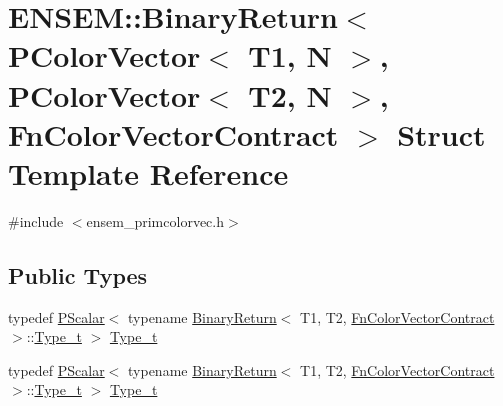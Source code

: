 \hypertarget{structENSEM_1_1BinaryReturn_3_01PColorVector_3_01T1_00_01N_01_4_00_01PColorVector_3_01T2_00_01N_62be6e61418b73621b95945775a1489e}{}\section{E\+N\+S\+EM\+:\+:Binary\+Return$<$ P\+Color\+Vector$<$ T1, N $>$, P\+Color\+Vector$<$ T2, N $>$, Fn\+Color\+Vector\+Contract $>$ Struct Template Reference}
\label{structENSEM_1_1BinaryReturn_3_01PColorVector_3_01T1_00_01N_01_4_00_01PColorVector_3_01T2_00_01N_62be6e61418b73621b95945775a1489e}


{\ttfamily \#include $<$ensem\+\_\+primcolorvec.\+h$>$}

\subsection*{Public Types}
\begin{DoxyCompactItemize}
\item 
typedef \mbox{\hyperlink{classENSEM_1_1PScalar}{P\+Scalar}}$<$ typename \mbox{\hyperlink{structENSEM_1_1BinaryReturn}{Binary\+Return}}$<$ T1, T2, \mbox{\hyperlink{structENSEM_1_1FnColorVectorContract}{Fn\+Color\+Vector\+Contract}} $>$\+::\mbox{\hyperlink{structENSEM_1_1BinaryReturn_3_01PColorVector_3_01T1_00_01N_01_4_00_01PColorVector_3_01T2_00_01N_62be6e61418b73621b95945775a1489e_ab0000a71b9f307783d8928d9bc4488aa}{Type\+\_\+t}} $>$ \mbox{\hyperlink{structENSEM_1_1BinaryReturn_3_01PColorVector_3_01T1_00_01N_01_4_00_01PColorVector_3_01T2_00_01N_62be6e61418b73621b95945775a1489e_ab0000a71b9f307783d8928d9bc4488aa}{Type\+\_\+t}}
\item 
typedef \mbox{\hyperlink{classENSEM_1_1PScalar}{P\+Scalar}}$<$ typename \mbox{\hyperlink{structENSEM_1_1BinaryReturn}{Binary\+Return}}$<$ T1, T2, \mbox{\hyperlink{structENSEM_1_1FnColorVectorContract}{Fn\+Color\+Vector\+Contract}} $>$\+::\mbox{\hyperlink{structENSEM_1_1BinaryReturn_3_01PColorVector_3_01T1_00_01N_01_4_00_01PColorVector_3_01T2_00_01N_62be6e61418b73621b95945775a1489e_ab0000a71b9f307783d8928d9bc4488aa}{Type\+\_\+t}} $>$ \mbox{\hyperlink{structENSEM_1_1BinaryReturn_3_01PColorVector_3_01T1_00_01N_01_4_00_01PColorVector_3_01T2_00_01N_62be6e61418b73621b95945775a1489e_ab0000a71b9f307783d8928d9bc4488aa}{Type\+\_\+t}}
\end{DoxyCompactItemize}



